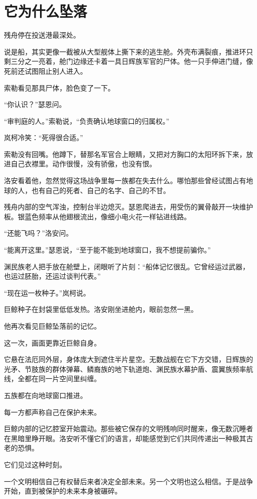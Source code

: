 \chapter{它为什么坠落}

残舟停在投送港最深处。

说是船，其实更像一截被从大型舰体上撕下来的逃生舱。外壳布满裂痕，推进环只剩三分之一亮着，舱门边缘还卡着一具日辉族军官的尸体。他一只手伸进门缝，像死前还试图阻止别人进入。

索勒看见那具尸体，脸色变了一下。

“你认识？”瑟恩问。

“审判庭的人。”索勒说，“负责确认地球窗口的归属权。”

岚柯冷笑：“死得很合适。”

索勒没有回嘴。他蹲下，替那名军官合上眼睛，又把对方胸口的太阳环拆下来，放进自己衣襟里。动作很慢，没有骄傲，也没有恨。

洛安看着他，忽然觉得这场战争里每一族都在失去什么。哪怕那些曾经试图占有地球的人，也有自己的死者、自己的名字、自己的不甘。

残舟内部的空气浑浊，控制台半边熄灭。瑟恩爬进去，用受伤的翼骨敲开一块维护板。银蓝色频率从他翅根流出，像细小电火花一样钻进线路。

“还能飞吗？”洛安问。

“能离开这里。”瑟恩说，“至于能不能到地球窗口，我不想提前骗你。”

渊民族老人把手放在舱壁上，闭眼听了片刻：“船体记忆很乱。它曾经运过武器，也运过胚胎，还运过谈判代表。”

“现在运一枚种子。”岚柯说。

巨鲸种子在封袋里低低发热。洛安刚坐进舱内，眼前忽然一黑。

他再次看见巨鲸坠落前的记忆。

这一次，画面更靠近巨鲸自身。

它悬在法厄同外层，身体庞大到遮住半片星空。无数战舰在它下方交错，日辉族的光矛、节肢族的群体弹幕、鳞裔族的地下轨道炮、渊民族水幕护盾、震翼族频率航线，全都在同一片空间里纠缠。

五族都在向地球窗口推进。

每一方都声称自己在保护未来。

巨鲸内部的记忆腔室开始震动。那些被它保存的文明残响同时醒来，像无数沉睡者在黑暗里睁开眼。洛安听不懂它们的语言，却能感觉到它们共同传递出一种极其古老的恐惧。

它们见过这种时刻。

一个文明相信自己有权替后来者决定全部未来。另一个文明也这么相信。于是战争开始，直到被保护的未来本身被碾碎。

